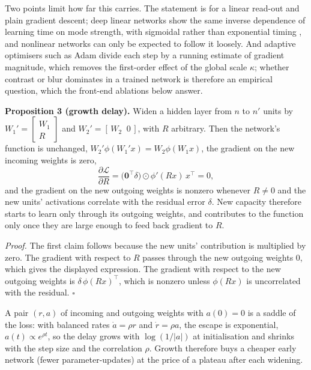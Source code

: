 \documentclass{article}
\begin{document}
Two points limit how far this carries. The statement is for a linear read-out and plain gradient descent; deep linear networks show the same inverse dependence of learning time on mode strength, with sigmoidal rather than exponential timing \autocite{saxe2019mathematical}, and nonlinear networks can only be expected to follow it loosely. And adaptive optimisers such as Adam divide each step by a running estimate of gradient magnitude, which removes the first-order effect of the global scale \(\kappa\); whether contrast or blur dominates in a trained network is therefore an empirical question, which the front-end ablations below answer.

\textbf{Proposition 3 (growth delay).} Widen a hidden layer from \(n\) to \(n'\) units by \(W_1'=\begin{bmatrix}W_1\\R\end{bmatrix}\) and \(W_2'=[\,W_2\;\;0\,]\), with \(R\) arbitrary. Then the network's function is unchanged, \(W_2'\phi(W_1'x)=W_2\phi(W_1x)\), the gradient on the new incoming weights is zero,
\begin{equation}\frac{\partial\mathcal L}{\partial R}=\big(\mathbf 0^\top\delta\big)\odot\phi'(Rx)\,x^\top=0,\end{equation}
and the gradient on the new outgoing weights is nonzero whenever \(R\neq0\) and the new units' activations correlate with the residual error \(\delta\). New capacity therefore starts to learn only through its outgoing weights, and contributes to the function only once they are large enough to feed back gradient to \(R\).

\emph{Proof.} The first claim follows because the new units' contribution is multiplied by zero. The gradient with respect to \(R\) passes through the new outgoing weights \(0\), which gives the displayed expression. The gradient with respect to the new outgoing weights is \(\delta\,\phi(Rx)^\top\), which is nonzero unless \(\phi(Rx)\) is uncorrelated with the residual. \(\square\)

A pair \((r,a)\) of incoming and outgoing weights with \(a(0)=0\) is a saddle of the loss: with balanced rates \(\dot a=\rho r\) and \(\dot r=\rho a\), the escape is exponential, \(a(t)\propto e^{\rho t}\), so the delay grows with \(\log(1/\lvert a\rvert)\) at initialisation and shrinks with the step size and the correlation \(\rho\). Growth therefore buys a cheaper early network (fewer parameter-updates) at the price of a plateau after each widening.
\end{document}
